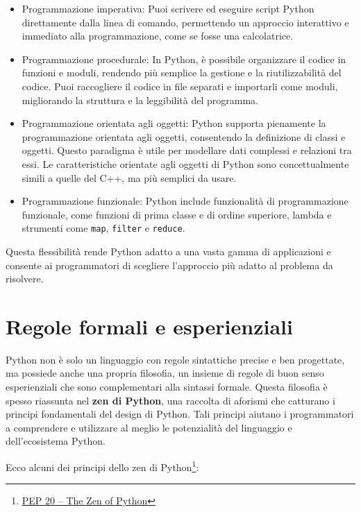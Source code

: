 \documentclass[
  letterpaper,
]{scrbook}
\begin{document}
\begin{itemize}
\item
  Programmazione imperativa: Puoi scrivere ed eseguire script Python
  direttamente dalla linea di comando, permettendo un approccio
  interattivo e immediato alla programmazione, come se fosse una
  calcolatrice.
\item
  Programmazione procedurale: In Python, è possibile organizzare il
  codice in funzioni e moduli, rendendo più semplice la gestione e la
  riutilizzabilità del codice. Puoi raccogliere il codice in file
  separati e importarli come moduli, migliorando la struttura e la
  leggibilità del programma.
\item
  Programmazione orientata agli oggetti: Python supporta pienamente la
  programmazione orientata agli oggetti, consentendo la definizione di
  classi e oggetti. Questo paradigma è utile per modellare dati
  complessi e relazioni tra essi. Le caratteristiche orientate agli
  oggetti di Python sono concettualmente simili a quelle del C++, ma più
  semplici da usare.
\item
  Programmazione funzionale: Python include funzionalità di
  programmazione funzionale, come funzioni di prima classe e di ordine
  superiore, lambda e strumenti come \texttt{map}, \texttt{filter} e
  \texttt{reduce}.
\end{itemize}

Questa flessibilità rende Python adatto a una vasta gamma di
applicazioni e consente ai programmatori di scegliere l'approccio più
adatto al problema da risolvere.

\section{Regole formali e
esperienziali}\label{regole-formali-e-esperienziali}

Python non è solo un linguaggio con regole sintattiche precise e ben
progettate, ma possiede anche una propria filosofia, un insieme di
regole di buon senso esperienziali che sono complementari alla sintassi
formale. Questa filosofia è spesso riassunta nel \textbf{zen di Python},
una raccolta di aforismi che catturano i principi fondamentali del
design di Python. Tali principi aiutano i programmatori a comprendere e
utilizzare al meglio le potenzialità del linguaggio e dell'ecosistema
Python.

Ecco alcuni dei principi dello zen di Python\footnote{\href{https://peps.python.org/pep-0020/}{PEP
  20 -- The Zen of Python}}:
\end{document}
